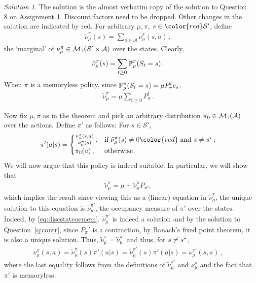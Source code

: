 \documentclass{article}
\DeclareMathOperator*{\1}{\mathbbm{1}}
\theoremstyle{definition}
\theoremstyle{remark}
\newtheorem*{solution*}{Solution}
\newcommand{\cS}{\mathcal{S}}
\newcommand{\cA}{\mathcal{A}}
\begin{document}
\begin{solution*}
The solution is the almost verbatim copy of the solution to Question 8 on Assignment 1. Discount factors need to be dropped. Other changes in the solution are indicated by {\color{red} red}.
For arbitrary $\mu,\pi$, $s\in {\color{red} \cS'}$,
define
\begin{align*}
\tilde \nu_\mu^\pi(s) = \sum_{a\in \cA} \nu_\mu^\pi(s,a)\,,
\end{align*}
the `marginal' of $\nu_\mu^\pi\in \cM_1(\cS'\times \cA)$ over the states.
Clearly, 
\begin{align*}
\tilde \nu_\mu^\pi(s)  = \sum_{t\ge 0} \mathbb{P}_\mu^\pi(S_t=s)\,.
\end{align*}
When $\pi$ is a memoryless policy, since $\mathbb{P}_\mu^\pi(S_t=s) = \mu P_\pi^t e_s$, 
\begin{align} \label{eq:discstateocmem}
\tilde \nu_\mu^\pi =  \mu \sum_{t\ge 0} P_\pi^t\,.
\end{align}

Now fix $\mu,\pi$ as in the theorem 
and pick an arbitrary distribution $\pi_0\in \cM_1(\cA)$ over the actions. 
Define $\pi'$ as follows: For $s\in \cS'$,
\begin{align*}
\pi'(a|s) = 
\begin{cases}
\frac{\nu_\mu^\pi(s,a)}{{\tilde{\nu}}_\mu^\pi(s)}\,, & \text{if } \tilde \nu_\mu^\pi(s)\ne 0
{\color{red} \text{ and } s\ne \term}\,;\\
\pi_0(a)\,, & \text{otherwise}\,.
\end{cases}
\end{align*}
We will now argue that this policy is indeed suitable. In particular, we will show that 
\begin{align}
\label{eq:statemargeq}
\tilde \nu_\mu^\pi = \mu +  \tilde \nu_\mu^\pi P_{\pi'},
\end{align}
which implies the result since viewing this as a (linear) 
equation in $\tilde \nu_\mu^\pi$, the unique solution to this equation is $\tilde \nu_\mu^{\pi'}$, the  occupancy measure of $\pi'$ over the states.
{\color{red} Indeed,
by \cref{eq:discstateocmem}, $\tilde \nu_\mu^{\pi'}$ is indeed a solution and by
 the solution to Question~\ref{q:contr}, since $P_\pi'$ is a contraction, by Banach's fixed point theorem, it is also a unique solution.}
Thus, $\tilde \nu_\mu^\pi = \tilde\nu_\mu^{\pi'}$ and thus, {\color{red} for $s\ne s^{\star}$,}
\begin{align*}
\nu^\pi_\mu(s,a) = \tilde \nu_\mu^\pi(s) \pi'(a|s) = \tilde \nu_\mu^{\pi'}(s) \pi'(a|s) = \nu_\mu^{\pi'}(s,a)\,,
\end{align*}
where the last equality follows from the definitions of $\tilde \nu_\mu^{\pi'}$ and $\nu_\mu^\pi$ and the fact that $\pi'$ is memoryless.


\end{solution*}
\end{document}
